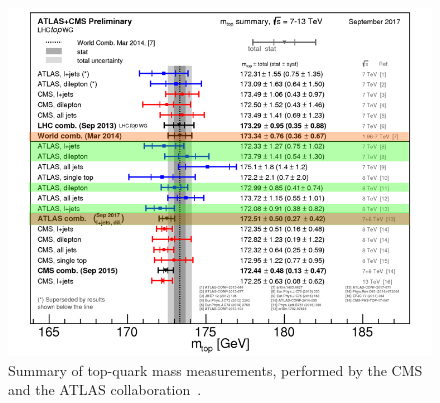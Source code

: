 \begin{figure}[h]
	\centering
	\includegraphics[width=0.9\linewidth]{Pics/mass}
	\caption{Summary of top-quark mass measurements, performed by the CMS and the ATLAS collaboration~\cite{PubR}. }
	
	\label{fig:mass}
\end{figure}



